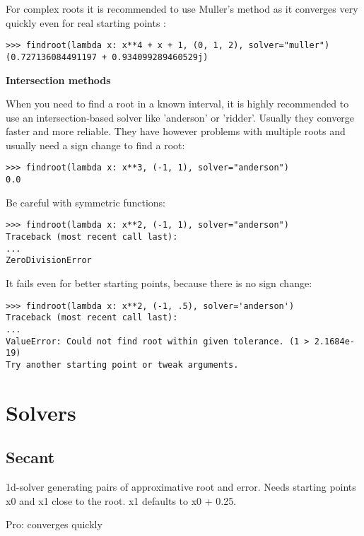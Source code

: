 For complex roots it is recommended to use Muller's method as it converges very quickly even for real starting points :

\begin{lstlisting}
>>> findroot(lambda x: x**4 + x + 1, (0, 1, 2), solver="muller")
(0.727136084491197 + 0.934099289460529j)
\end{lstlisting}

\textbf{Intersection methods}

When you need to find a root in a known interval, it is highly recommended to use an intersection-based solver like 'anderson' or 'ridder'. Usually they converge faster and more reliable. They have however problems with multiple roots and usually need a sign change to find a root:

\begin{lstlisting}
>>> findroot(lambda x: x**3, (-1, 1), solver="anderson")
0.0
\end{lstlisting}


Be careful with symmetric functions:

\begin{lstlisting}
>>> findroot(lambda x: x**2, (-1, 1), solver="anderson")
Traceback (most recent call last):
...
ZeroDivisionError
\end{lstlisting}

It fails even for better starting points, because there is no sign change:

\begin{lstlisting}
>>> findroot(lambda x: x**2, (-1, .5), solver='anderson')
Traceback (most recent call last):
...
ValueError: Could not find root within given tolerance. (1 > 2.1684e-19)
Try another starting point or tweak arguments.
\end{lstlisting}


\newpage
\section{Solvers}

\subsection{Secant}
1d-solver generating pairs of approximative root and error.
Needs starting points x0 and x1 close to the root. x1 defaults to x0 + 0.25.

Pro: converges quickly

